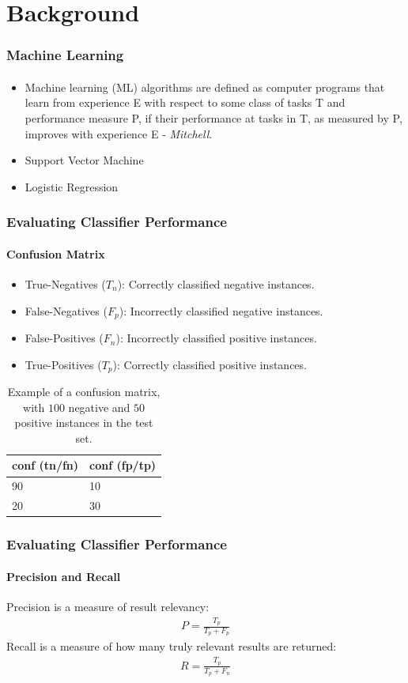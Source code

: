 \documentclass{beamer}
\begin{document}
\section{Background}
\begin{frame}
    \frametitle{Machine Learning}
    \framesubtitle{}
\begin{itemize}
  \item Machine learning (ML) algorithms are defined as computer programs that learn from experience E
with respect to some class of tasks T and performance measure P, if their performance at
tasks in T, as measured by P, improves with experience E - \textit{Mitchell}.
  \item Support Vector Machine
  \item Logistic Regression
\end{itemize}
\end{frame}
\begin{frame}
    \frametitle{Evaluating Classifier Performance}
    \framesubtitle{Confusion Matrix}
    \begin{itemize}
      \item True-Negatives ($T_n$): Correctly classified negative instances.
      \item False-Negatives ($F_p$): Incorrectly classified negative instances.
      \item False-Positives ($F_n$): Incorrectly classified positive instances.
      \item True-Positives ($T_p$): Correctly classified positive instances.
    \end{itemize}
    \begin{table}[H]
    \centering
    \caption{Example of a confusion matrix, with $100$ negative and $50$ positive instances in the test set.}
    \label{tab:confEx}
    \begin{tabular}{|l||l|}\hline
    conf (tn/fn) & conf (fp/tp) \\ \hline
    90 & 10 \\ \hline
    20 & 30 \\ \hline
    \end{tabular}
    \end{table}
\end{frame}
\begin{frame}
    \frametitle{Evaluating Classifier Performance}
    \framesubtitle{Precision and Recall}
    Precision is a measure of result relevancy:
    \begin{equation}
    \label{eq:precision}
    \begin{aligned}
    P = \frac{T_p}{T_p+F_p}
    \end{aligned}
    \end{equation}
    Recall is a measure of how many truly relevant results are returned:
    \begin{equation}
    \label{eq:recall}
    \begin{aligned}
    R = \frac{T_p}{T_p+F_n}
    \end{aligned}
    \end{equation}
\end{frame}
\end{document}
